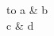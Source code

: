 \documentclass{article}\usepackage{tabu,longtable}
\begin{document}
\begin{longtabu} to \linewidth {X[l]X[r]}
a & b \\
c & d \\
\end{longtabu}
\end{document}
